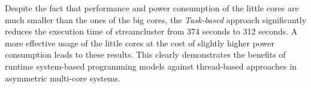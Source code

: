 Despite the fact that performance and power consumption of the little cores are much smaller than the ones of the big cores, the \emph{Task-based} approach significantly reduces the execution time of streamcluster from 374 seconds to 312 seconds. A more effective usage of the little cores at the cost of slightly higher power consumption leads to these results. This clearly demonstrates the benefits of runtime system-based programming models against thread-based approaches in asymmetric multi-core systems.










